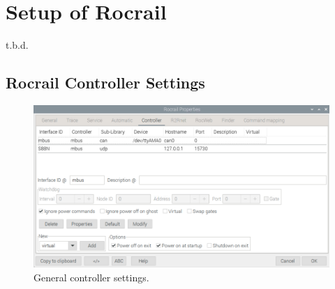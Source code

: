 \section{Setup of Rocrail}
t.b.d.

\subsection{Rocrail Controller Settings}

\begin{figure}[h!]
	\centering
	\includegraphics[width=1.00\linewidth]{../figures/rocrailcontrollersettings/generalcontrollersettings.png}
	\caption{General controller settings.}
	\label{fig:generalcontrollersettings}
\end{figure}

